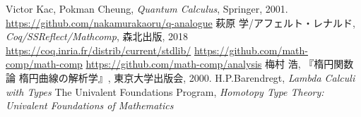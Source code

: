 \documentclass[11pt]{jsreport}
\theoremstyle{mystyle}
\newcommand{\0}{\textbf{0}}
\begin{document}
\begin{thebibliography}{9}
   Victor Kac, Pokman Cheung, {\it{Quantum Calculus}}, Springer, 2001.
   \url{https://github.com/nakamurakaoru/q-analogue}
   萩原 学/アフェルト・レナルド, {\it Coq/SSReflect/Mathcomp}, 森北出版, 
    2018
   \url{https://coq.inria.fr/distrib/current/stdlib/}
   \url{https://github.com/math-comp/math-comp}
   \url{https://github.com/math-comp/analysis}
   梅村 浩, 『楕円関数論  楕円曲線の解析学』, 東京大学出版会, 2000.
   H.P.Barendregt, {\it{Lambda Calculi with Types}}
   The Univalent Foundations Program, 
                      {\it{Homotopy Type Theory: Univalent Foundations of Mathematics}}

\end{thebibliography}
\end{document}
